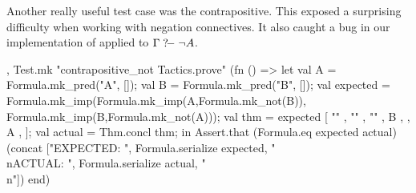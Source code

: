 \begin{node}
Another really useful test case was the contrapositive. This exposed a
surprising difficulty when working with negation connectives. It also
caught a bug in our implementation of {\Tt{}\nwendquote} applied to
$\Gamma\mathrel{?\!-}\neg A$.
\end{node}

\nwenddocs{}\plusendmoddef\nwstartdeflinemarkup{}\nwenddeflinemarkup
, Test.mk "contrapositive_not Tactics.prove" (fn () =>
    let
      val A = Formula.mk_pred("A", []);
      val B = Formula.mk_pred("B", []);
      val expected = Formula.mk_imp(Formula.mk_imp(A,Formula.mk_not(B)),
                                    Formula.mk_imp(B,Formula.mk_not(A)));
      val thm =  expected
                             [  ""
                             ,  ""
                             ,  ""
                             ,  B
                             , 
                             ,  A
                             ,  ];
      val actual = Thm.concl thm;
    in
      Assert.that (Formula.eq expected actual)
                  (concat ["EXPECTED: ",
                           Formula.serialize expected,
                           "\\nACTUAL: ",
                           Formula.serialize actual,
                           "\\n"])
    end)
